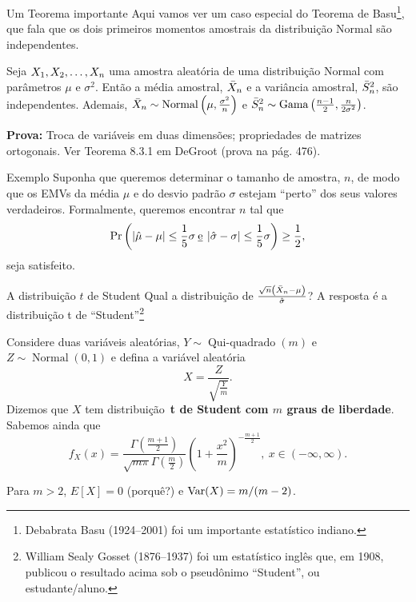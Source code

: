 \begin{frame}{Um Teorema importante}
 Aqui vamos ver um caso especial do Teorema de Basu\footnote{Debabrata Basu (1924--2001) foi um importante estatístico indiano.}, que fala que os dois primeiros momentos amostrais da distribuição Normal são independentes.
 \begin{theo}
 \label{thm:independence_sample_mean_variance_normal}
  Seja $X_1, X_2, \ldots, X_n$ uma amostra aleatória de uma distribuição Normal com parâmetros $\mu$ e $\sigma^2$.
  Então a média amostral, $\bar{X}_n$ e a variância amostral, $\bar{S}^2_n$, são independentes.
  Ademais, $\bar{X}_n \sim \operatorname{Normal}\left(\mu, \frac{\sigma^2}{n}\right)$ e $\bar{S}^2_n \sim \operatorname{Gama}\left(\frac{n-1}{2},  \frac{n}{2\sigma^2}\right)$.
 \end{theo}
\textbf{Prova:} Troca de variáveis em duas dimensões; propriedades de matrizes ortogonais.
Ver Teorema 8.3.1 em DeGroot (prova na pág. 476).
\end{frame}

\begin{frame}{Exemplo}
 Suponha que queremos determinar o tamanho de amostra, $n$, de modo que os EMVs da média $\mu$ e do desvio padrão $\sigma$ estejam ``perto'' dos seus valores verdadeiros.
 Formalmente, queremos encontrar $n$ tal que
 \[ \operatorname{Pr}\left( \left|\hat{\mu} - \mu\right| \leq \frac{1}{5}\sigma \: \text{\underline{e}} \: \left|\hat{\sigma}-\sigma\right| \leq  \frac{1}{5}\sigma \right) \geq \frac{1}{2} ,\]
 seja satisfeito.
\end{frame}

\begin{frame}{A distribuição $t$ de Student}
 Qual a distribuição de $\frac{\sqrt{n}\left(\bar{X}_n - \mu\right)}{\hat{\sigma}}$?
 A resposta é a distribuição t de ``Student''\footnote{William Sealy Gosset (1876--1937) foi um estatístico inglês que, em 1908, publicou o resultado acima sob o pseudônimo ``Student'', ou estudante/aluno.}
 
 \begin{defn}[A distribuição t]
 \label{def:Student_t_distribution}
  Considere duas variáveis aleatórias, $Y \sim\operatorname{Qui-quadrado}(m)$ e $Z \sim\operatorname{Normal}(0, 1)$ e defina a variável aleatória
  \[ X = \frac{Z}{\sqrt{\frac{Y}{m}}}. \]
 Dizemos que $X$  tem distribuição~\textbf{t de Student com $m$ graus de liberdade}. 
 Sabemos ainda que
 \[f_X(x) = \frac{\Gamma(\frac{m + 1}{2})}{\sqrt{m\pi}\Gamma(\frac{m}{2})} \left(1 + \frac{x^2}{m}\right)^{-\frac{m+1}{2}},\: x \in (-\infty, \infty). \]
 \end{defn}
Para $m>2$, $E[X] = 0$ (porquê?) e $\operatorname{Var}(X) = m/(m-2)$.
\end{frame}


